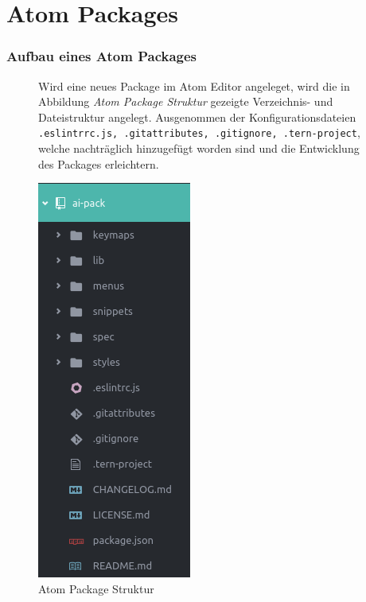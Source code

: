 \part{Atom Packages}
\section{Aufbau eines Atom Packages}
    \begin{figure}[htbp]
        \begin{minipage}{0.6\textwidth}
            Wird eine neues Package im Atom Editor angeleget, wird die in Abbildung \textit{Atom Package Struktur} gezeigte Verzeichnis- und Dateistruktur angelegt. Ausgenommen der Konfigurationsdateien \texttt{.eslintrrc.js, .gitattributes, .gitignore, .tern-project}, welche nachträglich hinzugefügt worden sind und die Entwicklung des Packages erleichtern.
        \end{minipage}
        \begin{minipage}{0.4\textwidth}
            \centering
            \includegraphics[scale=0.5]{img/package_structure.png}
            \caption{Atom Package Struktur}
        \end{minipage}
    \end{figure}

